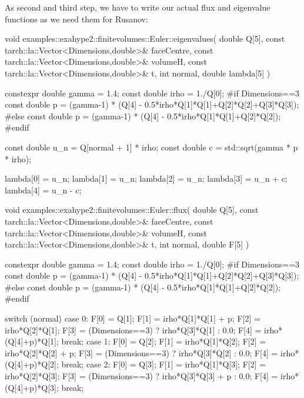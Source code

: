\noindent
As second and third step, we have to write our actual flux and eigenvalue
functions as we need them for Rusanov:
\begin{code}
void examples::exahype2::finitevolumes::Euler::eigenvalues(
  double                                       Q[5],
  const tarch::la::Vector<Dimensions,double>&  faceCentre,
  const tarch::la::Vector<Dimensions,double>&  volumeH,
  const tarch::la::Vector<Dimensions,double>&  t,
  int                                          normal,
  double                                       lambda[5]
) {
  constexpr double gamma = 1.4;
  const double irho = 1./Q[0];
  #if Dimensions==3
  const double p = (gamma-1) * (Q[4] - 0.5*irho*Q[1]*Q[1]+Q[2]*Q[2]+Q[3]*Q[3]);
  #else
  const double p = (gamma-1) * (Q[4] - 0.5*irho*Q[1]*Q[1]+Q[2]*Q[2]);
  #endif

  const double u_n = Q[normal + 1] * irho;
  const double c   = std::sqrt(gamma * p * irho);

  lambda[0]  = u_n;
  lambda[1]  = u_n;
  lambda[2]  = u_n;
  lambda[3]  = u_n + c;
  lambda[4]  = u_n - c;
}
\end{code}

\begin{code}
void examples::exahype2::finitevolumes::Euler::flux(
  double                                       Q[5],
  const tarch::la::Vector<Dimensions,double>&  faceCentre,
  const tarch::la::Vector<Dimensions,double>&  volumeH,
  const tarch::la::Vector<Dimensions,double>&  t,
  int                                          normal,
  double                                       F[5]
) {
  constexpr double gamma = 1.4;
  const double irho = 1./Q[0];
  #if Dimensions==3
  const double p = (gamma-1) * (Q[4] - 0.5*irho*Q[1]*Q[1]+Q[2]*Q[2]+Q[3]*Q[3]);
  #else
  const double p = (gamma-1) * (Q[4] - 0.5*irho*Q[1]*Q[1]+Q[2]*Q[2]);
  #endif

  switch (normal) {
    case 0:
        {
          F[0] = Q[1];
          F[1] = irho*Q[1]*Q[1] + p;
          F[2] = irho*Q[2]*Q[1];
          F[3] = (Dimensions==3) ? irho*Q[3]*Q[1] : 0.0;
          F[4] = irho*(Q[4]+p)*Q[1];
        }
        break;
    case 1:
        {
          F[0] = Q[2];
          F[1] = irho*Q[1]*Q[2];
          F[2] = irho*Q[2]*Q[2] + p;
          F[3] = (Dimensions==3) ? irho*Q[3]*Q[2] : 0.0;
          F[4] = irho*(Q[4]+p)*Q[2];
        }
        break;
    case 2:
        {
          F[0] = Q[3];
          F[1] = irho*Q[1]*Q[3];
          F[2] = irho*Q[2]*Q[3];
          F[3] = (Dimensions==3) ? irho*Q[3]*Q[3] + p : 0.0;
          F[4] = irho*(Q[4]+p)*Q[3];
        }
        break;
  }
}
\end{code}


